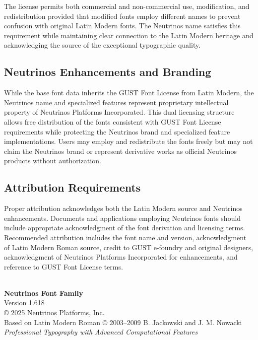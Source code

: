 \documentclass[11pt,letterpaper]{article}
\begin{document}
The license permits both commercial and non-commercial use, modification, and redistribution provided that modified fonts employ different names to prevent confusion with original Latin Modern fonts. The Neutrinos name satisfies this requirement while maintaining clear connection to the Latin Modern heritage and acknowledging the source of the exceptional typographic quality.

\subsection{Neutrinos Enhancements and Branding}

While the base font data inherits the GUST Font License from Latin Modern, the Neutrinos name and specialized features represent proprietary intellectual property of Neutrinos Platforms Incorporated. This dual licensing structure allows free distribution of the fonts consistent with GUST Font License requirements while protecting the Neutrinos brand and specialized feature implementations. Users may employ and redistribute the fonts freely but may not claim the Neutrinos brand or represent derivative works as official Neutrinos products without authorization.

\subsection{Attribution Requirements}

Proper attribution acknowledges both the Latin Modern source and Neutrinos enhancements. Documents and applications employing Neutrinos fonts should include appropriate acknowledgment of the font derivation and licensing terms. Recommended attribution includes the font name and version, acknowledgment of Latin Modern Roman source, credit to GUST e-foundry and original designers, acknowledgment of Neutrinos Platforms Incorporated for enhancements, and reference to GUST Font License terms.

\vfill

\begin{center}
\\[1em]
{\large\textbf{Neutrinos Font Family}}\\
{\large Version 1.618}\\[0.5em]
{\small © 2025 Neutrinos Platforms, Inc.}\\
{\small Based on Latin Modern Roman © 2003--2009 B. Jackowski and J. M. Nowacki}\\[0.5em]
{\small\textit{Professional Typography with Advanced Computational Features}}
\end{center}
\end{document}

